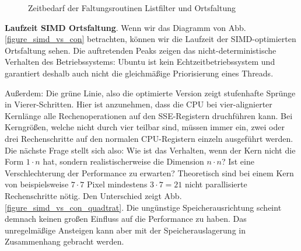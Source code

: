\documentclass[a4paper,12pt]{article}
\begin{document}
  

\begin{figure}[htbp]
\caption{Zeitbedarf der Faltungsroutinen Listfilter und Ortsfaltung}%
\label{figure__list_vs_convolve}
\end{figure}


\textbf{Laufzeit SIMD Ortsfaltung}. 
Wenn wir das Diagramm von Abb. \ref{figure_simd_vs_con} betrachten, können wir
die Laufzeit der SIMD-optimierten Ortsfaltung sehen. Die auftretenden Peaks
zeigen das nicht-deterministische Verhalten des Betriebssystems: Ubuntu ist kein
Echtzeitbetriebssystem und garantiert deshalb auch nicht die gleichmäßige
Priorisierung eines Threads. 

Außerdem: Die grüne Linie, also die optimierte Version zeigt stufenhafte
Sprünge in Vierer-Schritten. Hier ist anzunehmen, dass die CPU bei
vier-alignierter Kernlänge alle Rechenoperationen auf den SSE-Registern
druchführen kann. Bei Kerngrößen, welche nicht durch vier teilbar sind, müssen
immer ein, zwei oder drei Rechenschritte auf den normalen CPU-Registern
einzeln ausgeführt werden. Die nächste Frage stellt sich also: Wie ist das
Verhalten, wenn der Kern nicht die Form $1 \cdot n$ hat, sondern realistischer\-weise 
die Dimension $n \cdot n$? Ist eine Verschlechterung der Performance zu
erwarten? Theoretisch sind bei einem Kern von beispielsweise $7 \cdot 7$ Pixel
mindestens $3 \cdot 7 = 21$ nicht parallisierte Rechenschritte nötig. Den
Unterschied zeigt Abb. \ref{figure_simd_vs_con_quadtrat}. Die ungünstige
Speicherausrichtung scheint demnach keinen großen Einfluss auf die Performance
zu haben. Das unregelmäßige Ansteigen kann aber mit der Speicherauslagerung in
Zusammenhang gebracht werden.
\end{document}

